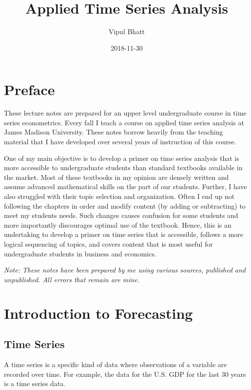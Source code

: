 \documentclass[]{book}
\title{Applied Time Series Analysis}
\author{Vipul Bhatt}
\date{2018-11-30}
\theoremstyle{definition}
\theoremstyle{definition}
\theoremstyle{definition}
\theoremstyle{remark}
\begin{document}
\maketitle

{
\setcounter{tocdepth}{1}
\tableofcontents
}
\hypertarget{preface}{%
\chapter*{Preface}\label{preface}}

These lecture notes are prepared for an upper level undergraduate course
in time series econometrics. Every fall I teach a course on applied time
series analysis at James Madison University. These notes borrow heavily
from the teaching material that I have developed over several years of
instruction of this course.

One of my main objective is to develop a primer on time series analysis
that is more accessible to undergraduate students than standard
textbooks available in the market. Most of these textbooks in my opinion
are densely written and assume advanced mathematical skills on the part
of our students. Further, I have also struggled with their topic
selection and organization. Often I end up not following the chapters in
order and modify content (by adding or subtracting) to meet my students
needs. Such changes causes confusion for some students and more
importantly discourages optimal use of the textbook. Hence, this is an
undertaking to develop a primer on time series that is accessible,
follows a more logical sequencing of topics, and covers content that is
most useful for undergraduate students in business and economics.

\emph{Note: These notes have been prepared by me using various sources,
published and unpublished. All errors that remain are mine.}

\hypertarget{intro}{%
\chapter{Introduction to Forecasting}\label{intro}}

\hypertarget{time-series}{%
\section{Time Series}\label{time-series}}

A time series is a specific kind of data where observations of a
variable are recorded over time. For example, the data for the U.S. GDP
for the last 30 years is a time series data.
\end{document}
